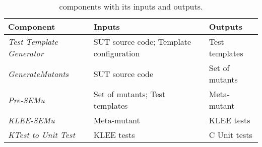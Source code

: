 
\begin{table}[h]
\scriptsize
\centering
\caption{\SEMUS components with its inputs and outputs.}
\label{table:semus:components}

\begin{tabular}{lll}
\hline 
\textbf{Component}	&	\textbf{Inputs}	&	\textbf{Outputs}\\
\hline 
\emph{Test Template Generator}&SUT source code; Template configuration&Test templates\\ 
\emph{GenerateMutants}&SUT source code&Set of mutants\\
\emph{Pre-SEMu}&Set of mutants; Test templates&Meta-mutant\\
\emph{KLEE-SEMu}&Meta-mutant&KLEE tests\\
\emph{KTest to Unit Test}&KLEE tests& C Unit tests\\
\hline
\end{tabular}
\end{table}
